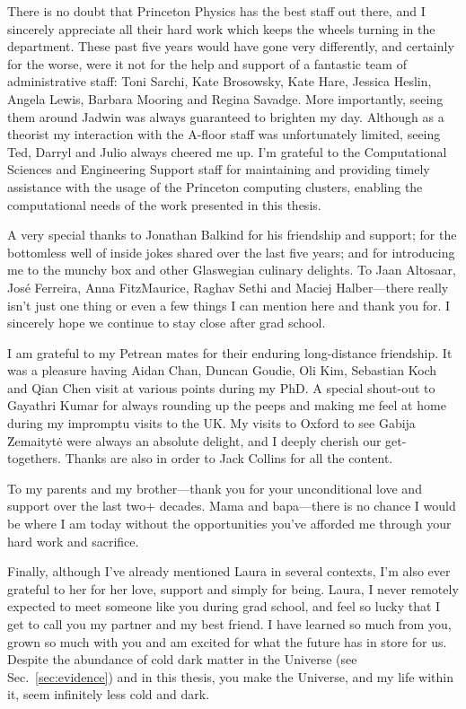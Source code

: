 There is no doubt that Princeton Physics has the best staff out there, and I sincerely appreciate all their hard work which keeps the wheels turning in the department. These  past five years would have gone very differently, and certainly for the worse, were it not for the help and support of a fantastic team of administrative staff: Toni Sarchi, Kate Brosowsky, Kate Hare, Jessica Heslin, Angela Lewis, Barbara Mooring and Regina Savadge. More importantly, seeing them around Jadwin was always guaranteed to brighten my day. 
Although as a theorist my interaction with the A-floor staff was unfortunately limited, seeing Ted, Darryl and Julio always cheered me up. I'm grateful to the Computational Sciences and Engineering Support staff for maintaining and providing timely assistance with the usage of the Princeton computing clusters, enabling the computational needs of the work presented in this thesis.

A very special thanks to Jonathan Balkind for his friendship and support; for the bottomless well of inside jokes shared over the last five years; and for introducing me to the munchy box and other Glaswegian culinary delights. To Jaan Altosaar, Jos\'e Ferreira, Anna FitzMaurice, Raghav Sethi and Maciej Halber---there really isn't just one thing or even a few things I can mention here and thank you for. I sincerely hope we continue to stay close after grad school.

I am grateful to my Petrean mates for their enduring long-distance friendship. It was a pleasure having Aidan Chan, Duncan Goudie, Oli Kim, Sebastian Koch and Qian Chen visit at various points during my PhD. A special shout-out to Gayathri Kumar for always rounding up the peeps and making me feel at home during my impromptu visits to the UK. My visits to Oxford to see Gabija \u{Z}emaityt\.{e} were always an absolute delight, and I deeply cherish our get-togethers. Thanks are also in order to Jack Collins for all the content.

To my parents and my brother---thank you for your unconditional love and support over the last two+ decades. Mama and bapa---there is no chance I would be where I am today without the opportunities you've afforded me through your hard work and sacrifice.

Finally, although I've already mentioned Laura in several contexts, I'm also ever grateful to her for her love, support and simply for being. Laura, I never remotely expected to meet someone like you during grad school, and feel so lucky that I get to call you my partner and my best friend. I have learned so much from you, grown so much with you and am excited for what the future has in store for us. Despite the abundance of cold dark matter in the Universe (see Sec.~\ref{sec:evidence}) and in this thesis, you make the Universe, and my life within it, seem infinitely less cold and dark.

\sectionline

